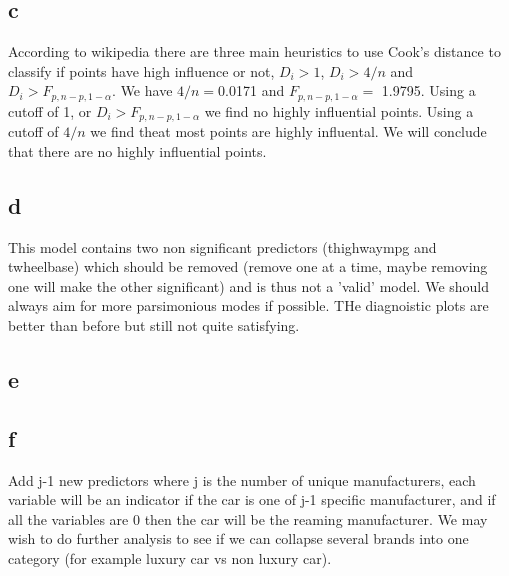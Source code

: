 \documentclass{article}\usepackage[]{graphicx}\usepackage[]{color}
\begin{document}
\subsection*{c}
According to wikipedia there are three main heuristics to use Cook's distance to classify if points have high influence or not, $D_i>1$, $D_i>4/n$ and $D_i>F_{p,n-p,1-\alpha}$. We have $4/n=$0.0171 and $F_{p,n-p,1-\alpha} =$ 1.9795. Using a cutoff of 1, or $D_i>F_{p,n-p,1-\alpha}$ we find no highly influential points. Using a cutoff of $4/n$ we find theat most points are highly influental. We will conclude that there are no highly influential points.
\subsection*{d}
This model contains two non significant predictors (thighwaympg and twheelbase) which should be removed (remove one at a time, maybe removing one will make the other significant) and is thus not a 'valid' model. We should always aim for more parsimonious modes if possible. THe diagnoistic plots are better than before but still not quite satisfying.

\subsection*{e}

\subsection*{f}
Add j-1 new predictors where j is the number of unique manufacturers, each variable will be an indicator if the car is one of j-1 specific manufacturer, and if all the variables are 0 then the car will be the reaming manufacturer. We may wish to do further analysis to see if we can collapse several brands into one category (for example luxury car vs non luxury car).
\end{document}
